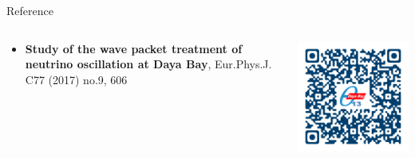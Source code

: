 \documentclass[usenames, dvipsnames]{beamer}
\newcommand{\Important}{\textcolor{BrickRed}}
\newcommand{\impitem}{\item[\Important{$\bullet$}]}
\begin{document}
\begin{frame}[fragile]
\begin{columns}[T]
\begin{column}{.47\textwidth}
\begin{block}{Reference}
    \begin{columns}[T]
        \begin{column}{0.7\textwidth}
            \begin{itemize}
                \impitem \textbf{Study of the wave packet treatment of neutrino
                oscillation at Daya Bay}, Eur.Phys.J. C77 (2017) no.9, 606
            \end{itemize}
        \end{column}
        \begin{column}{0.3\textwidth}
        \vspace*{-2.5cm}
            \includegraphics[scale=0.7]{./pics/paper_qr_logo.png}
        \end{column}
    \end{columns}
\end{block}

\end{column}


\end{columns}
\end{frame}
\end{document}
